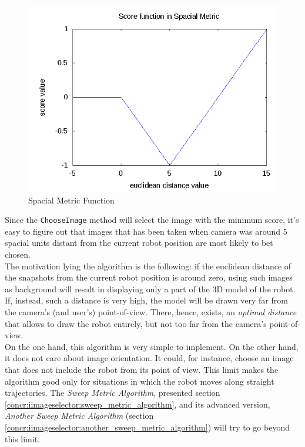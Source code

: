 \begin{figure}[!h]
  \begin{center}
    \includegraphics[width=400pt]{img/spacialMetricFunc.png} 
    \caption{Spacial Metric Function}
    \label{fig:spacial_metric_func}
  \end{center}
\end{figure}

Since the \texttt{ChooseImage} method will select the image with 
the minimum score, it's easy to figure out that 
images that has been taken when camera was around 
5 spacial units distant from the current robot position
are most likely to bet chosen.
\\
The motivation lying the algorithm is the following: 
if the euclidean distance of the snapshots from the current 
robot position is around zero, using such images as background 
will result in displaying only a part of the 3D model of the robot.
If, instead, such a distance is very high, the model will be drawn 
very far from the camera's (and user's) point-of-view.
There, hence, exists, an \textit{optimal distance} that allows 
to draw the robot entirely, but not too far from the camera's 
point-of-view. 
\\
On the one hand, this algorithm is very simple to implement.
On the other hand, it does not care about image orientation. 
It could, for instance, choose an image that does not include 
the robot from its point of view. 
This limit makes the algorithm good only for situations 
in which the robot moves along straight trajectories.
The \textit{Sweep Metric Algorithm}, presented section
\ref{concr:iimageselector:sweep_metric_algorithm}, and its advanced version,
\textit{Another Sweep Metric Algorithm} (section
\ref{concr:iimageselector:another_sweep_metric_algorithm})
will try to go beyond  this limit.


